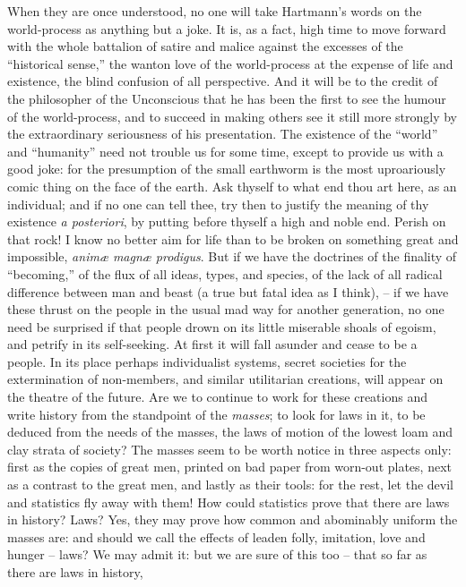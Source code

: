 When they are once understood, no one will take Hartmann's words on
the world-process as anything but a joke. It is, as a fact, high time
to move forward with the whole battalion of satire and malice against
the excesses of the \enquote{historical sense,} the wanton love of the
world-process at the expense of life and existence, the blind
confusion of all perspective. And it will be to the credit of the
philosopher of the Unconscious that he has been the first to see the
humour of the world-process, and to succeed in making others see it
still more strongly by the extraordinary seriousness of his
presentation. The existence of the \enquote{world} and \enquote{humanity} need not
trouble us for some time, except to provide us with a good joke: for
the presumption of the small earthworm is the most uproariously comic
thing on the face of the earth. Ask thyself to what end thou art
here, as an individual; and if no one can tell thee, try then to
justify the meaning of thy existence \textit{a posteriori}, by putting
before thyself a high and noble end. Perish on that rock! I know no
better aim for life than to be broken on something great and
impossible, \textit{animæ magnæ prodigus}. But if we have the doctrines of
the finality of \enquote{becoming,} of the flux of all ideas, types, and
species, of the lack of all radical difference between man and beast
(a true but fatal idea as I think), -- if we have these thrust on the
people in the usual mad way for another generation, no one need be
surprised if that people drown on its little miserable shoals of
egoism, and petrify in its self-seeking. At first it will fall
asunder and cease to be a people. In its place perhaps individualist
systems, secret societies for the extermination of non-members, and
similar utilitarian creations, will appear on the theatre of the
future. Are we to continue to work for these creations and write
history from the standpoint of the \textit{masses}; to look for laws in it,
to be deduced from the needs of the masses, the laws of motion of the
lowest loam and clay strata of society? The masses seem to be worth
notice in three aspects only: first as the copies of great men,
printed on bad paper from worn-out plates, next as a contrast to the
great men, and lastly as their tools: for the rest, let the devil and
statistics fly away with them! How could statistics prove that there
are laws in history? Laws? Yes, they may prove how common and
abominably uniform the masses are: and should we call the effects of
leaden folly, imitation, love and hunger -- laws? We may admit it: but
we are sure of this too -- that so far as there are laws in history,
